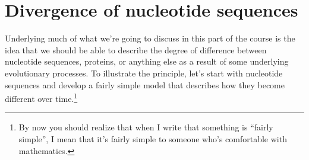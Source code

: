 \documentclass[12pt]{article}
\begin{document}
\section*{Divergence of nucleotide sequences}

Underlying much of what we're going to discuss in this part of the
course is the idea that we should be able to describe the degree of
difference between nucleotide sequences, proteins, or anything else as
a result of some underlying evolutionary processes. To illustrate the
principle, let's start with nucleotide sequences and develop a fairly
simple model that describes how they become different over
time.\footnote{By now you should realize that when I write that
  something is ``fairly simple'', I mean that it's fairly simple to
  someone who's comfortable with mathematics.}
\end{document}
